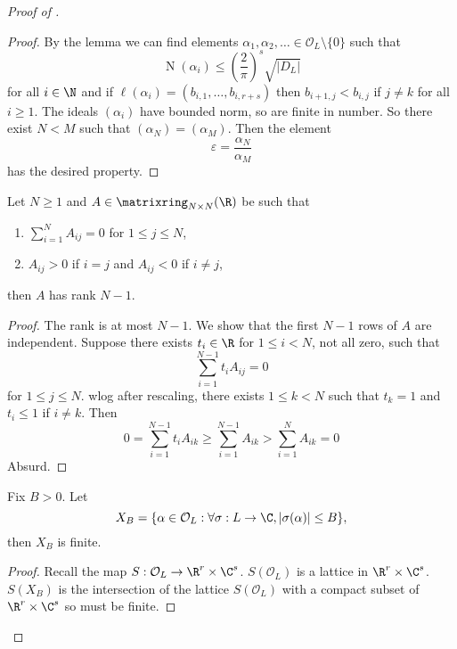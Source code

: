 \documentclass[a4paper]{article}
\renewcommand*{\O}{\mathcal{O}}
\DeclareMathOperator{\n}{N}
\begin{document}
\begin{proof}[Proof of ]
  \begin{proof}
    By the lemma we can find elements \(\alpha_1, \alpha_2, \dots \in \O_L \setminus \{0\}\) such that
    \[
      \n(\alpha_i) \leq \left( \frac{2}{\pi} \right)^s \sqrt{|D_L|}
    \]
    for all \(i \in \N\) and if \(\ell(\alpha_i) = (b_{i, 1}, \dots, b_{i, r + s})\) then \(b_{i + 1, j} < b_{i, j}\) if  \(j \neq k\) for all \(i \geq 1\). The ideals \((\alpha_i)\) have bounded norm, so are finite in number. So there exist \(N < M\) such that \((\alpha_N) = (\alpha_M)\). Then the element
    \[
      \varepsilon = \frac{\alpha_N}{\alpha_M}
    \]
    has the desired property.
  \end{proof}

  \begin{lemma}
    \label{lem:Dirichlet lemma 3}
    Let \(N \geq 1\) and \(A \in \matrixring_{N \times N} (\R)\) be such that
    \begin{enumerate}
    \item \(\sum_{i = 1}^N A_{ij} = 0\) for \(1 \leq j \leq N\),
    \item \(A_{ij} > 0\) if \(i = j\) and \(A_{ij} < 0\) if \(i \neq j\),
    \end{enumerate}
    then \(A\) has rank \(N - 1\).
  \end{lemma}

  \begin{proof}
    The rank is at most \(N - 1\). We show that the first \(N - 1\) rows of \(A\) are independent. Suppose there exists \(t_i \in \R\) for \(1 \leq i < N\), not all zero, such that
    \[
      \sum_{i = 1}^{N - 1} t_i A_{ij} = 0
    \]
    for \(1 \leq j \leq N\). wlog after rescaling, there exists \(1 \leq k < N\) such that \(t_k = 1\) and \(t_i \leq 1\) if \(i \neq k\). Then
    \[
      0 = \sum_{i = 1}^{N - 1} t_iA_{ik}
      \geq \sum_{i = 1}^{N - 1} A_{ik}
      > \sum_{i = 1}^N A_{ik}
      = 0
    \]
    Absurd.
  \end{proof}

  \begin{lemma}
    \label{lem:Dirichlet lemma 4}
    Fix \(B > 0\). Let
    \[
      X_B = \{\alpha \in \O_L: \forall \sigma: L \to \C, |\sigma(\alpha)| \leq B\},
    \]
    then \(X_B\) is finite.
  \end{lemma}

  \begin{proof}
    Recall the map \(S: \O_L \to \R^r \times \C^s\). \(S(\O_L)\) is a lattice in \(\R^r \times \C^s\). \(S(X_B)\) is the intersection of the lattice \(S(\O_L)\) with a compact subset of \(\R^r \times \C^s\) so must be finite.
  \end{proof}


\end{proof}
\end{document}

